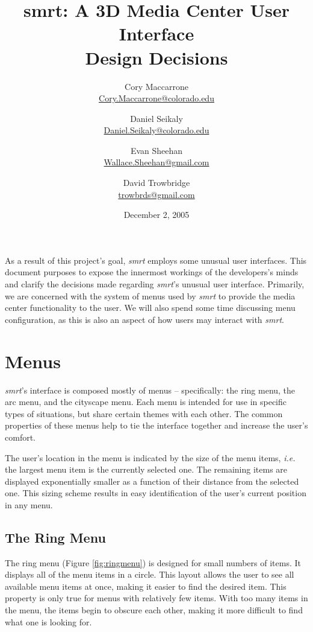 \documentclass[letterpaper, notitlepage, 11pt]{article}
\title{
	smrt: A 3D Media Center User Interface
	\\
	Design Decisions
}
\author{
	Cory Maccarrone  \\ {\small \href{mailto:Cory.Maccarrone@colorado.edu}{Cory.Maccarrone@colorado.edu}}
	\and
	Daniel Seikaly   \\ {\small \href{mailto:Daniel.Seikaly@colorado.edu}{Daniel.Seikaly@colorado.edu}}
	\and
	Evan Sheehan     \\ {\small \href{mailto:Wallace.Sheehan@gmail.com}{Wallace.Sheehan@gmail.com}}
	\and
	David Trowbridge \\ {\small \href{mailto:trowbrds@gmail.com}{trowbrds@gmail.com}}
}
\date{December 2, 2005}
\begin{document}
\maketitle

\raggedbottom


\hspace{1em}
\pagebreak

\tableofcontents

\pagebreak
\hspace{1em}
\pagebreak





As a result of this project's goal, \textit{smrt} employs some unusual user
interfaces.  This document purposes to expose the innermost workings of the
developers's minds and clarify the decisions made regarding \textit{smrt}'s
unusual user interface.  Primarily, we are concerned with the system of menus
used by \textit{smrt} to provide the media center functionality to the user.
We will also spend some time discussing menu configuration, as this is
also an aspect of how users may interact with \textit{smrt}.

\section{Menus}
\textit{smrt}'s interface is composed mostly of menus -- specifically: the
ring menu, the arc menu, and the cityscape menu.  Each menu is intended for use
in specific types of situations, but share certain themes with each other.  The
common properties of these menus help to tie the interface together and
increase the user's comfort.

The user's location in the menu is indicated by the size of the menu items,
\textit{i.e.} the largest menu item is the currently selected one.  The
remaining items are displayed exponentially smaller as a function of their
distance from the selected one.  This sizing scheme results in easy
identification of the user's current position in any menu.

\subsection{The Ring Menu}
The ring menu (Figure \ref{fig:ringmenu}) is designed for small numbers of
items.  It displays all of the menu items in a circle.  This layout allows the
user to see all available menu items at once, making it easier to find the
desired item.  This property is only true for menus with relatively few items.
With too many items in the menu, the items begin to obscure each other, making
it more difficult to find what one is looking for.
\end{document}

